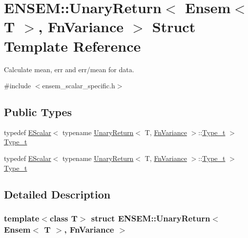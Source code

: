 \hypertarget{structENSEM_1_1UnaryReturn_3_01Ensem_3_01T_01_4_00_01FnVariance_01_4}{}\section{E\+N\+S\+EM\+:\+:Unary\+Return$<$ Ensem$<$ T $>$, Fn\+Variance $>$ Struct Template Reference}
\label{structENSEM_1_1UnaryReturn_3_01Ensem_3_01T_01_4_00_01FnVariance_01_4}


Calculate mean, err and err/mean for data.  




{\ttfamily \#include $<$ensem\+\_\+scalar\+\_\+specific.\+h$>$}

\subsection*{Public Types}
\begin{DoxyCompactItemize}
\item 
typedef \mbox{\hyperlink{classENSEM_1_1EScalar}{E\+Scalar}}$<$ typename \mbox{\hyperlink{structENSEM_1_1UnaryReturn}{Unary\+Return}}$<$ T, \mbox{\hyperlink{structENSEM_1_1FnVariance}{Fn\+Variance}} $>$\+::\mbox{\hyperlink{structENSEM_1_1UnaryReturn_3_01Ensem_3_01T_01_4_00_01FnVariance_01_4_ab460044d5646089e41eebeb2f5be9f33}{Type\+\_\+t}} $>$ \mbox{\hyperlink{structENSEM_1_1UnaryReturn_3_01Ensem_3_01T_01_4_00_01FnVariance_01_4_ab460044d5646089e41eebeb2f5be9f33}{Type\+\_\+t}}
\item 
typedef \mbox{\hyperlink{classENSEM_1_1EScalar}{E\+Scalar}}$<$ typename \mbox{\hyperlink{structENSEM_1_1UnaryReturn}{Unary\+Return}}$<$ T, \mbox{\hyperlink{structENSEM_1_1FnVariance}{Fn\+Variance}} $>$\+::\mbox{\hyperlink{structENSEM_1_1UnaryReturn_3_01Ensem_3_01T_01_4_00_01FnVariance_01_4_ab460044d5646089e41eebeb2f5be9f33}{Type\+\_\+t}} $>$ \mbox{\hyperlink{structENSEM_1_1UnaryReturn_3_01Ensem_3_01T_01_4_00_01FnVariance_01_4_ab460044d5646089e41eebeb2f5be9f33}{Type\+\_\+t}}
\end{DoxyCompactItemize}


\subsection{Detailed Description}
\subsubsection*{template$<$class T$>$\newline
struct E\+N\+S\+E\+M\+::\+Unary\+Return$<$ Ensem$<$ T $>$, Fn\+Variance $>$}

